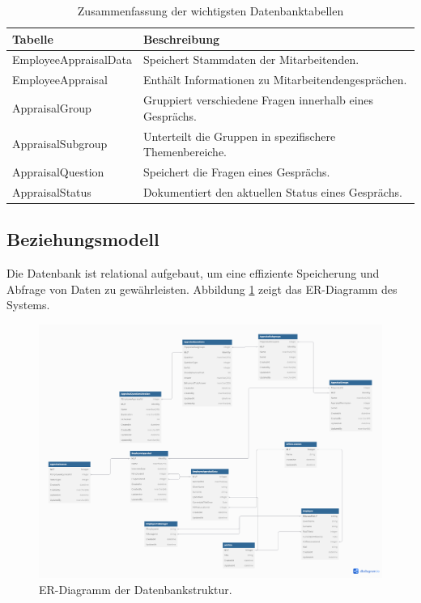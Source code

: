 \begin{table}[h!]
\centering
\caption{Zusammenfassung der wichtigsten Datenbanktabellen}
\label{tab:db_overview}
\begin{tabularx}{\textwidth}{|X|X|}
\hline
\textbf{Tabelle} & \textbf{Beschreibung} \\\hline
EmployeeAppraisalData & Speichert Stammdaten der Mitarbeitenden. \\\hline
EmployeeAppraisal & Enth\"alt Informationen zu Mitarbeitendengespr\"achen. \\\hline
AppraisalGroup & Gruppiert verschiedene Fragen innerhalb eines Gespr\"achs. \\\hline
AppraisalSubgroup & Unterteilt die Gruppen in spezifischere Themenbereiche. \\\hline
AppraisalQuestion & Speichert die Fragen eines Gespr\"achs. \\\hline
AppraisalStatus & Dokumentiert den aktuellen Status eines Gespr\"achs. \\\hline
\end{tabularx}
\end{table}

\subsection{Beziehungsmodell}
Die Datenbank ist relational aufgebaut, um eine effiziente Speicherung und Abfrage von Daten zu gew\"ahrleisten. Abbildung \ref{fig:db_er_model} zeigt das ER-Diagramm des Systems.

\begin{figure}[h!]
    \centering
    \includegraphics[width=1.0\textwidth]{images/er_modell_design.png}
    \caption{ER-Diagramm der Datenbankstruktur.}
    \label{fig:db_er_model}
\end{figure}

